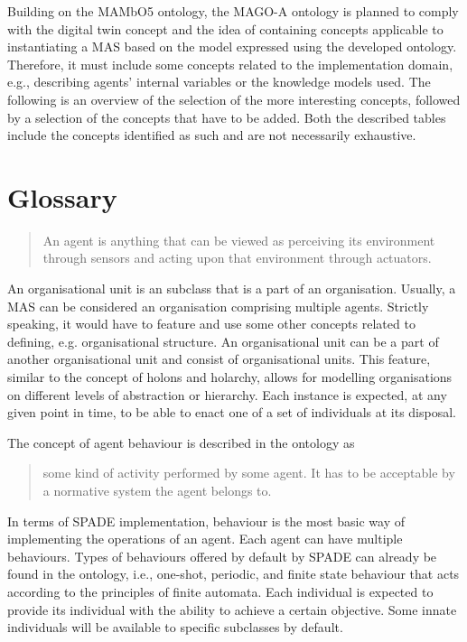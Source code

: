 Building on the MAMbO5 ontology, the MAGO-A ontology is planned to comply with the digital twin concept and the idea of containing concepts applicable to instantiating a \ac{MAS} based on the model expressed using the developed ontology. Therefore, it must include some concepts related to the implementation domain, e.g., describing agents' internal variables or the knowledge models used. The following is an overview of the selection of the more interesting concepts, followed by a selection of the concepts that have to be added. Both the described tables include the concepts identified as such and are not necessarily exhaustive.


\section{Glossary}

\blockquote[{{\cite[p. 54]{russell2022ArtificialIntelligenceModern}}}]{An agent is anything that can be viewed as perceiving its environment through sensors and acting upon that environment through actuators.} 

 An organisational unit is an  subclass that is a part of an organisation. Usually, a \ac{MAS} can be considered an organisation comprising multiple agents. Strictly speaking, it would have to feature and use some other concepts related to defining, e.g. organisational structure. An organisational unit can be a part of another organisational unit and consist of organisational units. This feature, similar to the concept of holons and holarchy, allows for modelling organisations on different levels of abstraction or hierarchy. Each  instance is expected, at any given point in time, to be able to enact one of a set of  individuals at its disposal. 

 The concept of agent behaviour is described in the  ontology as \blockquote{\textelp{} some kind of activity performed by some agent. It has to be acceptable by a normative system the agent belongs to.} In terms of SPADE implementation, behaviour is the most basic way of implementing the operations of an agent. Each agent can have multiple behaviours. Types of behaviours offered by default by SPADE can already be found in the  ontology,
%
i.e., one-shot, periodic, and finite state behaviour that acts according to the principles of finite automata. Each  individual is expected to provide its  individual with the ability to achieve a certain objective. Some innate  individuals will be available to specific  subclasses by default.

